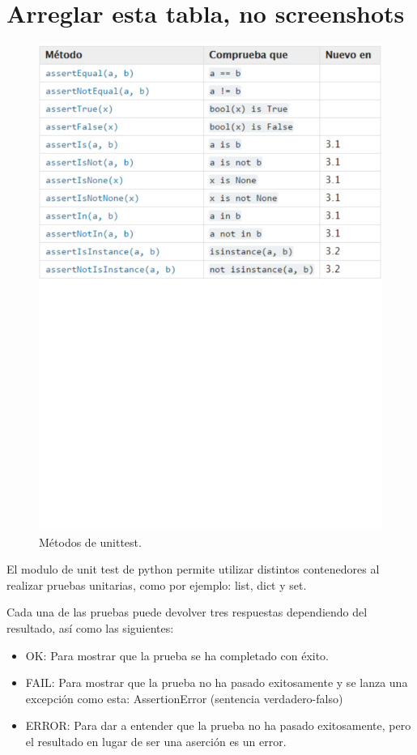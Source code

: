 \documentclass[conference]{IEEEtran}
\begin{document}
\section*{\textbf{Arreglar esta tabla, no screenshots}}
\begin{figure}[H]
\centering
\includegraphics[scale=0.45]{imagenes/metodos_-m.pdf}
\caption{Métodos de unittest.}
\end{figure}

El modulo de unit test de python permite utilizar distintos contenedores al realizar pruebas unitarias, como por ejemplo: list, dict y set.

Cada una de las pruebas puede devolver tres respuestas dependiendo del resultado, así como las siguientes:

\begin{itemize}
\item OK: Para mostrar que la prueba se ha completado con éxito.
\item FAIL: Para mostrar que la prueba no ha pasado exitosamente y se lanza una excepción como esta: AssertionError (sentencia verdadero-falso)
\item ERROR: Para dar a entender que la prueba no ha pasado exitosamente, pero el resultado en lugar de ser una aserción es un error.
\end{itemize}
\end{document}
